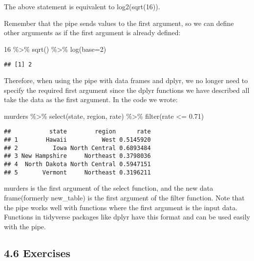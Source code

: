 \documentclass[
]{article}
\newenvironment{Shaded}{\begin{snugshade}}{\end{snugshade}}
\newcommand{\AttributeTok}[1]{\textcolor[rgb]{0.77,0.63,0.00}{#1}}
\newcommand{\DecValTok}[1]{\textcolor[rgb]{0.00,0.00,0.81}{#1}}
\newcommand{\FloatTok}[1]{\textcolor[rgb]{0.00,0.00,0.81}{#1}}
\newcommand{\FunctionTok}[1]{\textcolor[rgb]{0.00,0.00,0.00}{#1}}
\newcommand{\NormalTok}[1]{#1}
\newcommand{\SpecialCharTok}[1]{\textcolor[rgb]{0.00,0.00,0.00}{#1}}
\begin{document}
The above statement is equivalent to log2(sqrt(16)).

Remember that the pipe sends values to the first argument, so we can
define other arguments as if the first argument is already defined:

\begin{Shaded}
\begin{Highlighting}[]
\DecValTok{16} \SpecialCharTok{\%\textgreater{}\%} \FunctionTok{sqrt}\NormalTok{() }\SpecialCharTok{\%\textgreater{}\%} \FunctionTok{log}\NormalTok{(}\AttributeTok{base=}\DecValTok{2}\NormalTok{)}
\end{Highlighting}
\end{Shaded}

\begin{verbatim}
## [1] 2
\end{verbatim}

Therefore, when using the pipe with data frames and dplyr, we no longer
need to specify the required first argument since the dplyr functions we
have described all take the data as the first argument. In the code we
wrote:

\begin{Shaded}
\begin{Highlighting}[]
\NormalTok{murders }\SpecialCharTok{\%\textgreater{}\%} \FunctionTok{select}\NormalTok{(state, region, rate) }\SpecialCharTok{\%\textgreater{}\%} \FunctionTok{filter}\NormalTok{(rate }\SpecialCharTok{\textless{}=} \FloatTok{0.71}\NormalTok{)}
\end{Highlighting}
\end{Shaded}

\begin{verbatim}
##           state        region      rate
## 1        Hawaii          West 0.5145920
## 2          Iowa North Central 0.6893484
## 3 New Hampshire     Northeast 0.3798036
## 4  North Dakota North Central 0.5947151
## 5       Vermont     Northeast 0.3196211
\end{verbatim}

murders is the first argument of the select function, and the new data
frame(formerly new\_table) is the first argument of the filter function.
Note that the pipe works well with functions where the first argument is
the input data. Functions in tidyverse packages like dplyr have this
format and can be used easily with the pipe.

\hypertarget{exercises-2}{%
\subsection{4.6 Exercises}\label{exercises-2}}
\end{document}
